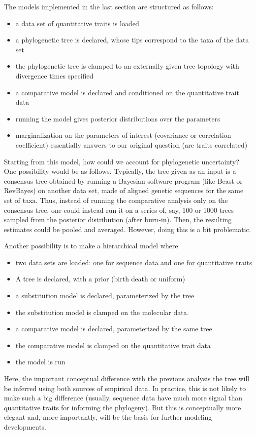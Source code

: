 \documentclass[11pt, oneside]{article}   	%
\begin{document}
The models implemented in the last section are structured as follows:
\begin{itemize}
\item
a data set of quantitative traits is loaded
\item
a phylogenetic tree is declared, whose tips correspond to the taxa of the data set
\item
the phylogenetic tree is clamped to an externally given tree topology with divergence times specified
\item
a comparative model is declared and conditioned on the quantitative trait data
\item
running the model gives posterior distributions over the parameters
\item
marginalization on the parameters of interest (covariance or correlation coefficient) essentially answers to our original question (are traits correlated)
\end{itemize}

Starting from this model, how could we account for phylogenetic uncertainty?
One possibility would be as follows.
Typically, the tree given as an input is a consensus tree obtained by running a Bayesian software program (like Beast or RevBayes) on another data set, made of aligned genetic sequences for the same set of taxa.
Thus, instead of running the comparative analysis only on the consensus tree, one could instead run it on a series of, say, 100 or 1000 trees sampled from the posterior distribution (after burn-in). Then, the resulting estimates could be pooled and averaged. However, doing this is a bit problematic.

Another possibility is to make a hierarchical model where
\begin{itemize}
\item
two data sets are loaded: one for sequence data and one for quantitative traits
\item
A tree is declared, with a prior (birth death or uniform)
\item
a substitution model is declared, parameterized by the tree
\item
the substitution model is clamped on the molecular data.
\item
a comparative model is declared, parameterized by the same tree
\item
the comparative model is clamped on the quantitative trait data
\item
the model is run
\end{itemize}
Here, the important conceptual difference with the previous analysis the tree will be inferred using both sources of empirical data. In practice, this is not likely to make such a big difference (usually, sequence data have much more signal than quantitative traits for informing the phylogeny). But this is conceptually more elegant and, more importantly, will be the basis for further modeling developments.
\end{document}
